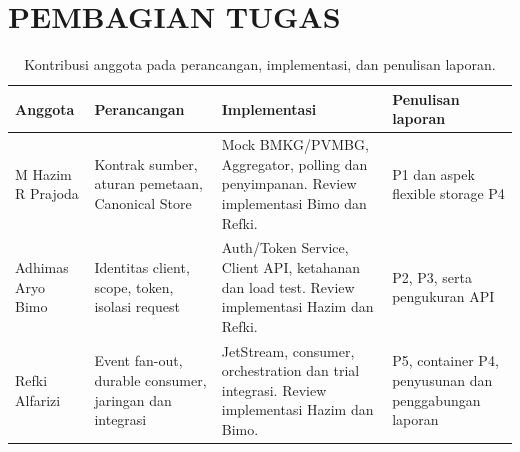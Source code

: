 \chapter{PEMBAGIAN TUGAS}
\begin{table}[htbp]
\centering\small
\begin{tabularx}{\textwidth}{>{\raggedright\arraybackslash}p{3.4cm}YYY}
\toprule
Anggota & Perancangan & Implementasi & Penulisan laporan \\
\midrule
M Hazim R Prajoda & Kontrak sumber, aturan pemetaan, Canonical Store & Mock BMKG/PVMBG, Aggregator, polling dan penyimpanan. Review implementasi Bimo dan Refki. & P1 dan aspek flexible storage P4 \\
Adhimas Aryo Bimo & Identitas client, scope, token, isolasi request & Auth/Token Service, Client API, ketahanan dan load test. Review implementasi Hazim dan Refki. & P2, P3, serta pengukuran API \\
Refki Alfarizi & Event fan-out, durable consumer, jaringan dan integrasi & JetStream, consumer, orchestration dan trial integrasi. Review implementasi Hazim dan Bimo. & P5, container P4, penyusunan dan penggabungan laporan \\
\bottomrule
\end{tabularx}
\caption{Kontribusi anggota pada perancangan, implementasi, dan penulisan laporan.}
\end{table}



